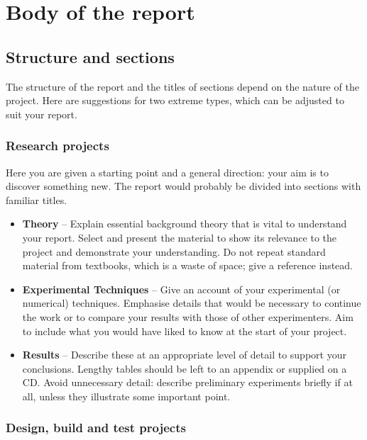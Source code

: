 \section{Body of the report}

\subsection{Structure and sections}

The structure of the report and the titles of sections depend on the nature of the project. Here are suggestions for two extreme types, which can be adjusted to suit your report.

\subsubsection{Research projects}

Here you are given a starting point and a general direction: your aim is to discover something new. The report would probably be divided into sections with familiar titles.
\begin{itemize}
\item
\textbf{Theory} -- 
Explain essential background theory that is vital to understand your report. Select and present the material to show its relevance to the project and demonstrate your understanding. Do not repeat standard material from textbooks, which is a waste of space; give a reference instead. 

\item
\textbf{Experimental Techniques} --
Give an account of your experimental (or numerical) techniques. Emphasise details that would be necessary to continue the work or to compare your results with those of other experimenters. Aim to include what you would have liked to know at the start of your project.

\item
\textbf{Results} --
Describe these at an appropriate level of detail to support your conclusions. Lengthy tables should be left to an appendix or supplied on a CD. Avoid unnecessary detail: describe preliminary experiments briefly if at all, unless they illustrate some important point.
\end{itemize}


\subsubsection{Design, build and test projects}

